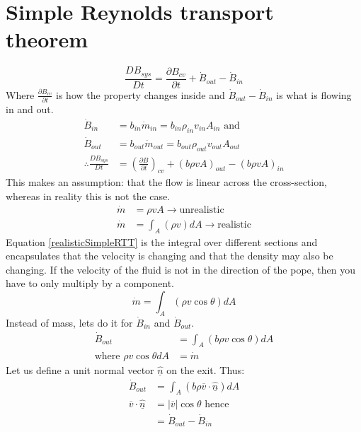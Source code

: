 \section{Simple Reynolds transport theorem}
\begin{equation}
  \frac{DB_{sys}}{Dt} = \frac{\partial B_{cv}}{\partial t} + \dot{B}_{out} - \dot{B}_{in}
\end{equation}
Where $\frac{\partial B_{cv}}{\partial t}$ is how the property changes inside and $\dot{B}_{out} - \dot{B}_{in}$ is what is flowing in and out.
\begin{align}
  \dot{B}_{in}                   & = b_{in} \dot{m}_{in} = b_{in}\rho_{in}v_{in}A_{in} \textrm{ and}                            \\
  \dot{B}_{out}                  & = b_{out} \dot{m}_{out} = b_{out}\rho_{out}v_{out}A_{out}                                    \\
  \therefore \frac{DB_{sys}}{Dt} & = \left( \frac{\partial B}{\partial t} \right)_{cv} + (b \rho v A)_{out} - (b \rho v A)_{in}
\end{align}
This makes an assumption: that the flow is linear across the cross-section, whereas in reality this is not the case.
\begin{align}
  \dot{m} & = \rho v A \rightarrow \textrm{unrealistic}                                    \\
  \dot{m} & = \int_A (\rho v) dA \rightarrow \textrm{realistic} \label{realisticSimpleRTT}
\end{align}
Equation \ref{realisticSimpleRTT} is the integral over different sections and encapsulates that the velocity is changing and that the density may also be changing. If the velocity of the fluid is not in the direction of the pope, then you have to only multiply by a component.
\begin{equation}
  \dot{m} = \int_A (\rho v \cos{\theta})dA
\end{equation}
Instead of mass, lets do it for $\dot{B}_{in}$ and $\dot{B}_{out}$.
\begin{align}
  \dot{B}_{out}                          & = \int_A (b \rho v \cos{\theta})dA \\
  \textrm{where } \rho v \cos{\theta} dA & = \dot{m}
\end{align}
Let us define a unit normal vector $\underline{\hat{n}}$ on the exit. Thus:
\begin{align}
  \dot{B}_{out}                          & = \int_A (b \rho \overline{v} \cdot \underline{\hat{n}}) dA \\
  \overline{v} \cdot \underline{\hat{n}} & = |\overline{v}| \cos{\theta} \textrm{ hence}               \\
                                         & = \dot{B}_{out} - \dot{B}_{in}
\end{align}
